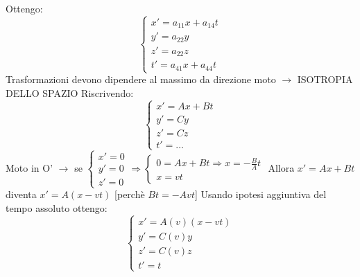 Ottengo:
\begin{equation*}
    \begin{cases}
        x' = a_{11}x + a_{14}t \\
        y' = a_{22}y \\
        z' = a_{22}z \\
        t' = a_{41}x + a_{44}t
    \end{cases}
\end{equation*}
Trasformazioni devono dipendere al massimo da direzione moto $\rightarrow$ ISOTROPIA DELLO SPAZIO \newline
Riscrivendo:
\begin{equation*}
    \begin{cases}
        x' = Ax + Bt \\
        y' = Cy \\
        z' = Cz \\
        t' = \dots 
    \end{cases}
\end{equation*}
Moto in O' $\rightarrow$ se 
$\begin{cases}
    x'=0 \\
    y'=0 \\
    z'=0
\end{cases} 
\Rightarrow 
\begin{cases}
    0 = Ax + Bt  \Rightarrow x = - \frac{B}{A}t\\
    x = vt 
\end{cases}$ 
\newline Allora $x' = Ax +Bt$ diventa $x'=A(x-vt)$ [perchè $Bt = -Avt$] \newline
Usando ipotesi aggiuntiva del tempo assoluto ottengo:
\begin{equation*}
    \begin{cases}
        x' = A(v)(x -vt) \\
        y' = C(v)y \\
        z' = C(v)z \\
        t' = t 
    \end{cases}
\end{equation*}
